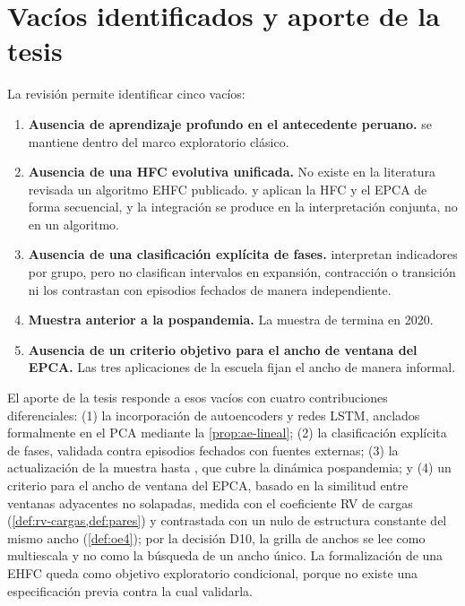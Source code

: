 \section{Vacíos identificados y aporte de la tesis}
\label{sec:vacios}

La revisión permite identificar cinco vacíos:

\begin{enumerate}[leftmargin=*]
  \item \textbf{Ausencia de aprendizaje profundo en el antecedente peruano.}
    \textcite{camiz_cerda_atoche_2026} se mantiene dentro del marco exploratorio clásico.
  \item \textbf{Ausencia de una HFC evolutiva unificada.} No existe en la literatura revisada un
    algoritmo EHFC publicado. \textcite{camiz_roig_2011} y \textcite{camiz_cerda_atoche_2026}
    aplican la HFC y el EPCA de forma secuencial, y la integración se produce en la interpretación
    conjunta, no en un algoritmo.
  \item \textbf{Ausencia de una clasificación explícita de fases.}
    \textcite{camiz_cerda_atoche_2026} interpretan indicadores por grupo, pero no clasifican
    intervalos en expansión, contracción o transición ni los contrastan con episodios fechados de
    manera independiente.
  \item \textbf{Muestra anterior a la pospandemia.} La muestra de
    \textcite{camiz_cerda_atoche_2026} termina en 2020.
  \item \textbf{Ausencia de un criterio objetivo para el ancho de ventana del EPCA.} Las tres
    aplicaciones de la escuela fijan el ancho de manera informal.
\end{enumerate}

El aporte de la tesis responde a esos vacíos con cuatro contribuciones diferenciales: (1) la
incorporación de autoencoders y redes LSTM, anclados formalmente en el PCA mediante la
\cref{prop:ae-lineal}; (2) la clasificación explícita de fases, validada contra episodios fechados
con fuentes externas; (3) la actualización de la muestra hasta \fechaFinDatos{}, que cubre la
dinámica pospandemia; y (4) un criterio para el ancho de ventana del EPCA, basado en la
similitud entre ventanas adyacentes no solapadas, medida con el coeficiente RV de cargas
(\cref{def:rv-cargas,def:pares}) y contrastada con un nulo de estructura constante del mismo ancho
(\cref{def:oe4}); por la decisión D10, la grilla de anchos se lee como multiescala y no como la
búsqueda de un ancho único. La formalización de una EHFC queda como objetivo
exploratorio condicional, porque no existe una especificación previa contra la cual validarla.
